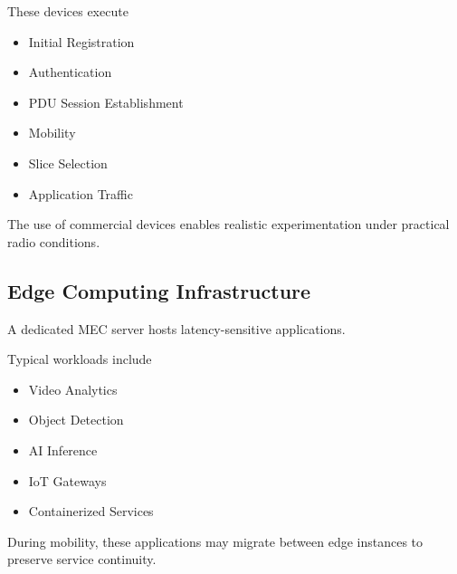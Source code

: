 \documentclass[12pt,a4paper]{article}\usepackage[a4paper,margin=1in]{geometry}\usepackage{graphicx}\usepackage{longtable}\usepackage{booktabs}\usepackage{hyperref}\usepackage{enumitem}\usepackage{amsmath}\usepackage{tikz}\usepackage{pgfgantt}\usepackage{setspace}\setstretch{1.15}\usetikzlibrary{positioning,arrows.meta,shapes.geometric}
\begin{document}
	These devices execute
	
	\begin{itemize}
		
		\item Initial Registration
		
		\item Authentication
		
		\item PDU Session Establishment
		
		\item Mobility
		
		\item Slice Selection
		
		\item Application Traffic
		
	\end{itemize}
	
	The use of commercial devices enables realistic experimentation under practical radio conditions.
	
	
	\subsection{Edge Computing Infrastructure}
	
	A dedicated MEC server hosts latency-sensitive applications.
	
	Typical workloads include
	
	\begin{itemize}
		
		\item Video Analytics
		
		\item Object Detection
		
		\item AI Inference
		
		\item IoT Gateways
		
		\item Containerized Services
		
	\end{itemize}
	
	During mobility, these applications may migrate between edge instances to preserve service continuity.
	
	
\end{document}
